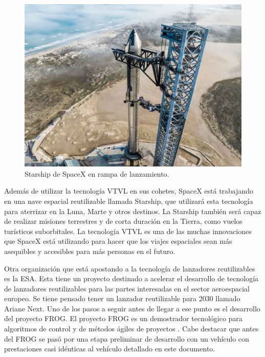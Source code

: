 \begin{figure}[htb]
    \centering
    \includegraphics[width=0.8\linewidth]{fig/starhip2.png}
    \caption{Starship de SpaceX en rampa de lanzamiento.}
    \label{fig:starshipcool}
\end{figure}


Además de utilizar la tecnología VTVL en sus cohetes, SpaceX está trabajando en una nave espacial reutilizable llamada Starship, que utilizará esta tecnología para aterrizar en la Luna, Marte y otros destinos. La Starship también será capaz de realizar misiones terrestres y de corta duración en la Tierra, como vuelos turísticos suborbitales. La tecnología VTVL es una de las muchas innovaciones que SpaceX está utilizando para hacer que los viajes espaciales sean más asequibles y accesibles para más personas en el futuro.

\medskip

Otra organización que está apostando a la tecnología de lanzadores reutilizables es la ESA. Esta tiene un proyecto destinado a acelerar el desarrollo de tecnología de lanzadores reutilizables para las partes interesadas en el sector aeroespacial europeo. Se tiene pensado tener un lanzador reutilizable para 2030 llamado Ariane Next. Uno de los pasos a seguir antes de llegar a ese punto es el desarrollo del proyecto FROG. El proyecto FROG es un demostrador tecnológico para algoritmos de control y de métodos ágiles de proyectos \cite{rmili2019frog}. Cabe destacar que antes del FROG se pasó por una etapa preliminar de desarrollo con un vehículo con prestaciones casi idénticas al vehículo detallado en este documento.


